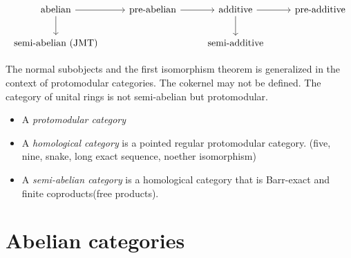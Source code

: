 \documentclass{../../large}
\begin{document}
\[\begin{tikzcd}[math mode=false]
abelian\ar{r}\ar{d} & pre-abelian \ar{r} & additive \ar{r}\ar{d} & pre-additive\\
semi-abelian (JMT) && semi-additive & \,
\end{tikzcd}\]



\begin{prb}
The normal subobjects and the first isomorphism theorem is generalized in the context of protomodular categories.
The cokernel may not be defined.
The category of unital rings is not semi-abelian but protomodular.
\begin{itemize}
\item A \emph{protomodular category}
\item A \emph{homological category} is a pointed regular protomodular category. (five, nine, snake, long exact sequence, noether isomorphism)
\item A \emph{semi-abelian category} is a homological category that is Barr-exact and finite coproducts(free products).
\end{itemize}
\end{prb}





\section{Abelian categories}
\end{document}
